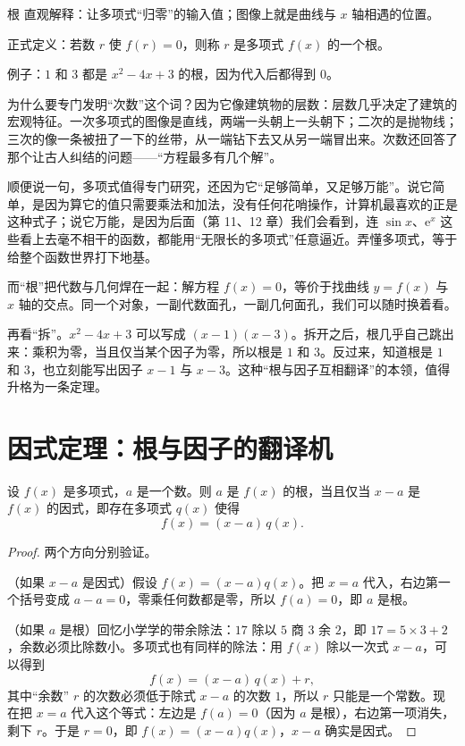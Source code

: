 \begin{shuyu}{根}
直观解释：让多项式“归零”的输入值；图像上就是曲线与 $x$ 轴相遇的位置。

正式定义：若数 $r$ 使 $f(r)=0$，则称 $r$ 是多项式 $f(x)$ 的一个根。

例子：$1$ 和 $3$ 都是 $x^2-4x+3$ 的根，因为代入后都得到 $0$。
\end{shuyu}

为什么要专门发明“次数”这个词？因为它像建筑物的层数：层数几乎决定了建筑的宏观特征。一次多项式的图像是直线，两端一头朝上一头朝下；二次的是抛物线；三次的像一条被扭了一下的丝带，从一端钻下去又从另一端冒出来。次数还回答了那个让古人纠结的问题——“方程最多有几个解”。

顺便说一句，多项式值得专门研究，还因为它“足够简单，又足够万能”。说它简单，是因为算它的值只需要乘法和加法，没有任何花哨操作，计算机最喜欢的正是这种式子；说它万能，是因为后面（第 11、12 章）我们会看到，连 $\sin x$、$\mathrm{e}^x$ 这些看上去毫不相干的函数，都能用“无限长的多项式”任意逼近。弄懂多项式，等于给整个函数世界打下地基。

而“根”把代数与几何焊在一起：解方程 $f(x)=0$，等价于找曲线 $y=f(x)$ 与 $x$ 轴的交点。同一个对象，一副代数面孔，一副几何面孔，我们可以随时换着看。

再看“拆”。$x^2-4x+3$ 可以写成 $(x-1)(x-3)$。拆开之后，根几乎自己跳出来：乘积为零，当且仅当某个因子为零，所以根是 $1$ 和 $3$。反过来，知道根是 $1$ 和 $3$，也立刻能写出因子 $x-1$ 与 $x-3$。这种“根与因子互相翻译”的本领，值得升格为一条定理。

\section{因式定理：根与因子的翻译机}

\begin{dingli}[因式定理]
设 $f(x)$ 是多项式，$a$ 是一个数。则 $a$ 是 $f(x)$ 的根，当且仅当 $x-a$ 是 $f(x)$ 的因式，即存在多项式 $q(x)$ 使得
\[
f(x) = (x-a)\,q(x).
\]
\end{dingli}

\begin{proof}
两个方向分别验证。

（如果 $x-a$ 是因式）假设 $f(x)=(x-a)q(x)$。把 $x=a$ 代入，右边第一个括号变成 $a-a=0$，零乘任何数都是零，所以 $f(a)=0$，即 $a$ 是根。

（如果 $a$ 是根）回忆小学学的带余除法：$17$ 除以 $5$ 商 $3$ 余 $2$，即 $17 = 5\times 3 + 2$，余数必须比除数小。多项式也有同样的除法：用 $f(x)$ 除以一次式 $x-a$，可以得到
\[
f(x) = (x-a)\,q(x) + r,
\]
其中“余数” $r$ 的次数必须低于除式 $x-a$ 的次数 $1$，所以 $r$ 只能是一个常数。现在把 $x=a$ 代入这个等式：左边是 $f(a)=0$（因为 $a$ 是根），右边第一项消失，剩下 $r$。于是 $r=0$，即 $f(x) = (x-a)q(x)$，$x-a$ 确实是因式。
\end{proof}

